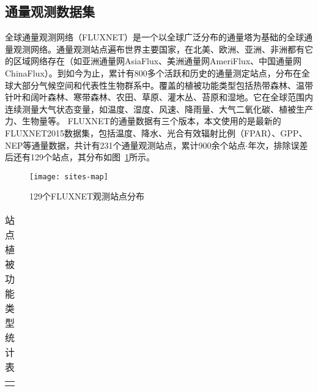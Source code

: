 \subsection{通量观测数据集}
全球通量观测网络（FLUXNET）是一个以全球广泛分布的通量塔为基础的全球通量观测网络。通量观测站点遍布世界主要国家，在北美、欧洲、亚洲、非洲都有它的区域网络存在（如亚洲通量网AsiaFlux、美洲通量网AmeriFlux、中国通量网ChinaFlux）。到如今为止，累计有800多个活跃和历史的通量测定站点，分布在全球大部分气候空间和代表性生物群系中。覆盖的植被功能类型包括热带森林、温带针叶和阔叶森林、寒带森林、农田、草原、灌木丛、苔原和湿地。它在全球范围内连续测量大气状态变量，如温度、湿度、风速、降雨量、大气二氧化碳、植被生产力、生物量等。
FLUXNET的通量数据有三个版本，本文使用的是最新的FLUXNET2015数据集，包括温度、降水、光合有效辐射比例（FPAR）、GPP、NEP等通量数据，共计有231个通量观测站点，累计900余个站点$\cdot$年次，排除误差后还有129个站点，其分布如图~\ref{fig:sites-map}所示。

\begin{figure}[!htbp]
    \centering
    \texttt{[image: sites-map]}
    \caption{129个FLUXNET观测站点分布}
    \label{fig:sites-map}
\end{figure}

\begin{table}[!htbp]
    \centering
    \caption{站点植被功能类型统计表}
    \label{tab:site-PFT-stat}
    \begin{threeparttable}
        \begin{tabular}{c}
            \Xhline{1.5pt}
            \Xhline{1.5pt}
            \Xhline{1.5pt}
        \end{tabular}
    \end{threeparttable}
\end{table}



